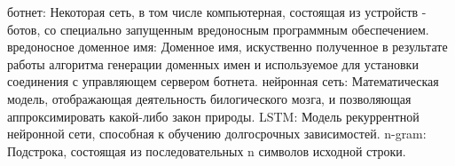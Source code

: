 
\noindent ботнет: Некоторая сеть, в том числе компьютерная, состоящая из устройств - ботов, со специально запущенным вредоносным программным обеспечением.
\newline
\linebreak
\noindent вредоносное доменное имя: Доменное имя, искуственно полученное в результате работы алгоритма генерации доменных имен и используемое для установки соединения с управляющем сервером ботнета.
\newline
\linebreak
\noindent нейронная сеть: Математическая модель, отображающая деятельность билогического мозга, и позволяющая аппроксимировать какой-либо закон природы.
\newline
\linebreak
\noindent LSTM: Модель рекуррентной нейронной сети, способная к обучению долгосрочных зависимостей.
\newline
\linebreak
\noindent n-gram: Подстрока, состоящая из последовательных n символов исходной строки.
\clearpage